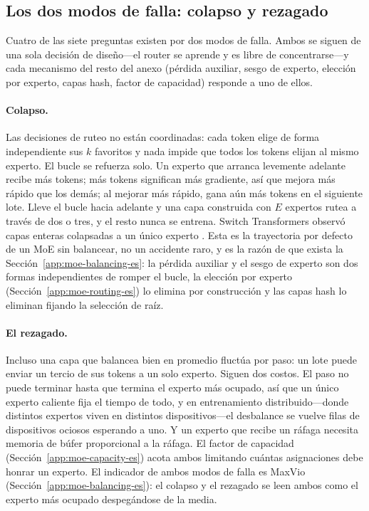 \subsection{Los dos modos de falla: colapso y rezagado}
\label{app:moe-failures-es}

Cuatro de las siete preguntas existen por dos modos de falla. Ambos se siguen
de una sola decisión de diseño---el router se aprende y es libre de
concentrarse---y cada mecanismo del resto del anexo (pérdida auxiliar, sesgo de
experto, elección por experto, capas hash, factor de capacidad) responde a uno
de ellos.

\paragraph{Colapso.}
Las decisiones de ruteo no están coordinadas: cada token elige de forma
independiente sus $k$ favoritos y nada impide que todos los tokens elijan al
mismo experto. El bucle se refuerza solo. Un experto que arranca levemente
adelante recibe más tokens; más tokens significan más gradiente, así que
mejora más rápido que los demás; al mejorar más rápido, gana aún más tokens en
el siguiente lote. Lleve el bucle hacia adelante y una capa construida con $E$
expertos rutea a través de dos o tres, y el resto nunca se entrena. Switch
Transformers observó capas enteras colapsadas a un único experto
\citep{fedus2021switch}. Esta es la trayectoria por defecto de un MoE sin
balancear, no un accidente raro, y es la razón de que exista la
Sección~\ref{app:moe-balancing-es}: la pérdida auxiliar y el sesgo de experto
son dos formas independientes de romper el bucle, la elección por experto
(Sección~\ref{app:moe-routing-es}) lo elimina por construcción y las capas
hash lo eliminan fijando la selección de raíz.

\paragraph{El rezagado.}
Incluso una capa que balancea bien en promedio fluctúa por paso: un lote puede
enviar un tercio de sus tokens a un solo experto. Siguen dos costos. El paso no
puede terminar hasta que termina el experto más ocupado, así que un único
experto caliente fija el tiempo de todo, y en entrenamiento
distribuido---donde distintos expertos viven en distintos dispositivos---el
desbalance se vuelve filas de dispositivos ociosos esperando a uno. Y un experto
que recibe un ráfaga necesita memoria de búfer proporcional a la ráfaga. El
factor de capacidad (Sección~\ref{app:moe-capacity-es}) acota ambos limitando
cuántas asignaciones debe honrar un experto. El indicador de ambos modos de
falla es MaxVio (Sección~\ref{app:moe-balancing-es}): el colapso y el rezagado
se leen ambos como el experto más ocupado despegándose de la media.

